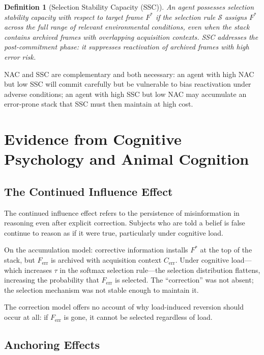 \documentclass[12pt]{article}
\newtheorem{definition}{Definition}
\begin{document}
\begin{definition}[Selection Stability Capacity (SSC)]
An agent possesses \emph{selection stability capacity} with respect
to target frame $F^*$ if the selection rule $\mathcal{S}$ assigns
$F^*$ across the full range of relevant environmental conditions,
even when the stack contains archived frames with overlapping
acquisition contexts.
SSC addresses the \emph{post-commitment} phase: it suppresses
reactivation of archived frames with high error risk.
\end{definition}

NAC and SSC are complementary and both necessary:
an agent with high NAC but low SSC will commit carefully but be
vulnerable to bias reactivation under adverse conditions;
an agent with high SSC but low NAC may accumulate an error-prone
stack that SSC must then maintain at high cost.

\section{Evidence from Cognitive Psychology and Animal Cognition}

\subsection{The Continued Influence Effect}

The continued influence effect \cite{ecker2022} refers to the
persistence of misinformation in reasoning even after explicit
correction.
Subjects who are told a belief is false continue to reason as if
it were true, particularly under cognitive load.

On the accumulation model: corrective information installs $F^*$
at the top of the stack, but $F_\mathrm{err}$ is archived with
acquisition context $C_\mathrm{err}$.
Under cognitive load---which increases $\tau$ in the softmax
selection rule---the selection distribution flattens, increasing
the probability that $F_\mathrm{err}$ is selected.
The ``correction'' was not absent; the selection mechanism was
not stable enough to maintain it.

The correction model offers no account of why load-induced reversion
should occur at all: if $F_\mathrm{err}$ is gone, it cannot be
selected regardless of load.

\subsection{Anchoring Effects}
\end{document}
